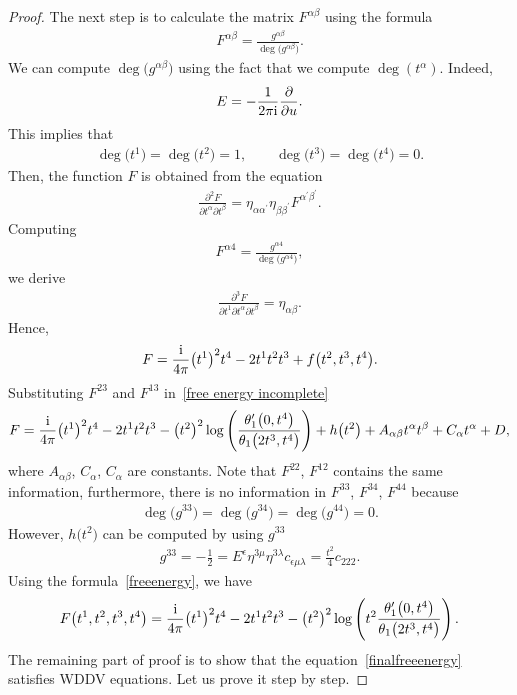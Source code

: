 \documentclass[pdftex]{sigma}%
\numberwithin{equation}{section}
\begin{document}
\begin{proof}
The next step is to calculate the matrix $F^{\alpha\beta}$ using the formula
\begin{gather}\label{Hessian formula}
F^{\alpha\beta}=\frac{g^{\alpha\beta}}{\deg \big( g^{\alpha\beta}\big)}.
\end{gather}
We can compute $\deg \big(g^{\alpha\beta}\big)$ using the fact that we compute $\deg (t^{\alpha})$. Indeed,
\begin{gather*}
E=-\frac{1}{2\pi {\rm i}}\frac{\partial}{\partial u}.
\end{gather*}
This implies that
\begin{gather*}
\deg \big(t^1\big)=\deg \big(t^2\big)=1,
\qquad
\deg \big(t^3\big)=\deg \big(t^4\big)=0.
\end{gather*}
Then, the function $F$ is obtained from the equation
\begin{gather*}
\frac{\partial^2 F}{\partial t^{\alpha}\partial t^{\beta}}=\eta_{\alpha\alpha^{\prime}}\eta_{\beta\beta^{\prime}}F^{\alpha^{\prime}\beta^{\prime}}.
\end{gather*}
Computing
\begin{gather*}
F^{\alpha4}=\frac{g^{\alpha 4}}{\deg \big(g^{\alpha 4}\big)},
\end{gather*}
we derive
\begin{gather*}\label{normalization}
\frac{\partial^3 F}{\partial t^1\partial t^{\alpha}\partial t^{\beta}}=\eta_{\alpha\beta}.
\end{gather*}
Hence,
\begin{gather}\label{free energy incomplete}
F=\frac{\rm i}{4\pi}\big(t^1\big)^2t^4-2t^1t^2t^3+f\big(t^2,t^3,t^4\big).
\end{gather}
Substituting $F^{23}$ and $F^{13}$ in~\eqref{free energy incomplete}
\begin{gather*}
F=\frac{\rm i}{4\pi}\big(t^1\big)^2t^4-2t^1t^2t^3-\big(t^2\big)^2\log \left(\frac{\theta_1^{\prime}\big(0,t^4\big)}{\theta_1\big(2t^3,t^4\big)}\right)+h\big(t^2\big) +A_{\alpha\beta}t^{\alpha}t^{\beta}+C_{\alpha}t^{\alpha}+D,
\end{gather*}
where $A_{\alpha\beta}$, $C_{\alpha}$, $C_{\alpha}$ are constants. Note that $F^{22}$, $F^{12}$ contains the same information, furthermore, there is no information in $F^{33}$, $F^{34}$, $F^{44}$ because
\begin{gather*}
\deg \big(g^{33}\big)=\deg \big(g^{34}\big)=\deg \big(g^{44}\big)=0.
\end{gather*}
However, $h\big(t^2\big)$ can be computed by using $g^{33}$
\begin{gather*}
g^{33}=-\frac{1}{2}=E^{\epsilon}\eta^{3\mu}\eta^{3\lambda}c_{\epsilon\mu\lambda}=\frac{t^2}{4}c_{222}.
\end{gather*}
Using the formula~\eqref{freeenergy}, we have
\begin{gather}\label{finalfreeenergy}
F\big(t^1,t^2,t^3,t^4\big)=\frac{\rm i}{4\pi}\big(t^1\big)^2t^4-2t^1t^2t^3-\big(t^2\big)^2 \log\left(t^2\frac{\theta_1^{\prime}\big(0,t^4\big)}{\theta_1\big(2t^3,t^4\big)}\right).
\end{gather}
The remaining part of proof is to show that the equation~\eqref{finalfreeenergy} satisfies WDDV equations. Let us prove it step by step.


\end{proof}
\end{document}
